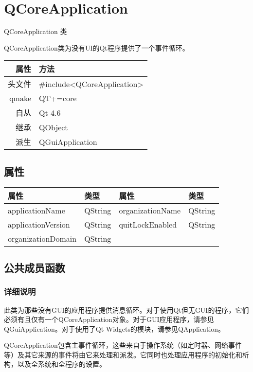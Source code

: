 \chapter{QCoreApplication}

QCoreApplication 类

QCoreApplication类为没有UI的Qt程序提供了一个事件循环。

\begin{tabular}{|r|l|}
\hline
属性&	方法\\
\hline
头文件&	\#include<QCoreApplication>\\
\hline
qmake&	QT+=core\\
\hline
自从&	Qt 4.6\\
\hline
继承&	QObject\\
\hline
派生&	QGuiApplication\\
\hline
\end{tabular}

\section{属性}

\begin{tabular}{|l|l|l|l|}
\hline
属性&	类型&	属性&	类型\\
\hline
applicationName&	QString&	organizationName&	QString\\
\hline
applicationVersion&	QString&	quitLockEnabled	&QString\\
\hline
organizationDomain&	QString&		&\\
\hline
\end{tabular}

\splitLine

\section{公共成员函数}

\subsection{详细说明}

此类为那些没有GUI的应用程序提供消息循环。对于使用Qt但无GUI的程序，它们必须有且仅有一个QCoreApplication对象。对于GUI应用程序，请参见QGuiApplication。对于使用了Qt Widgets的模块，请参见QApplication。

QCoreApplication包含主事件循环，这些来自于操作系统（如定时器、网络事件等）及其它来源的事件将由它来处理和派发。它同时也处理应用程序的初始化和析构，以及全系统和全程序的设置。

